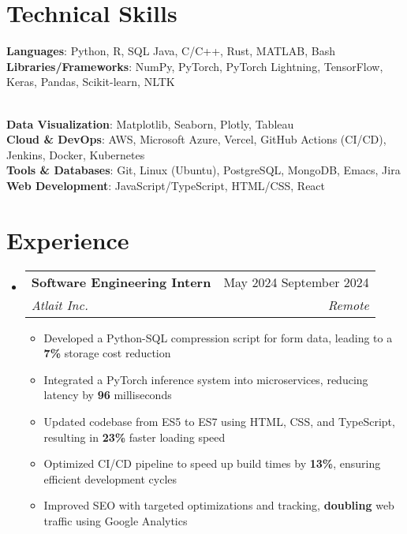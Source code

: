 \documentclass[letterpaper, 11pt]{article}
\makeatletter
\newcommand{\resumeItem}[1]{
    \item \small {
        {#1 \vspace{-3pt}} %
    }
}
\newcommand{\resumeSubheading}[4]{ %
  \vspace{-2pt}\item
    \begin{tabular*}{0.99\textwidth}[t]{l@{\extracolsep{\fill}}r}
      \textbf{#1} & #2 \\
      \textit{\small#3} & \textit{\small #4} \\
    \end{tabular*}\vspace{-7pt}
}
\newcommand{\resumeSubHeadingListStart}{\begin{itemize}[leftmargin=0.15in, label={}]}
\newcommand{\resumeSubHeadingListEnd}{\end{itemize}}
\newcommand{\resumeItemListStart}{\begin{itemize}}
\newcommand{\resumeItemListEnd}{\end{itemize}\vspace{-10pt}}
\makeatother
\begin{document}
\section{Technical Skills}
 \begin{itemize}[leftmargin=0.25in, label={}]
    \small{\item{
     \textbf{Languages}{: Python, R, SQL Java, C/C++, Rust, MATLAB, Bash} \\
     \textbf{Libraries/Frameworks}{: NumPy, PyTorch, PyTorch Lightning, TensorFlow, Keras, Pandas, Scikit-learn, NLTK}
    }} \\
    \textbf{Data Visualization}{: Matplotlib, Seaborn, Plotly, Tableau} \\
    \textbf{Cloud \& DevOps}{: AWS, Microsoft Azure, Vercel, GitHub Actions (CI/CD), Jenkins, Docker, Kubernetes} \\
     \textbf{Tools \& Databases}{: Git, Linux (Ubuntu), PostgreSQL, MongoDB,  Emacs, Jira} \\
     \textbf{Web Development}{: JavaScript/TypeScript, HTML/CSS, React} 
 \end{itemize}

\vspace{-25pt}

\section{Experience}
    \resumeSubHeadingListStart{}
        \resumeSubheading %
        {Software Engineering Intern}{May 2024 \textendash{} September 2024}
        {Atlait Inc.}{Remote}
        \resumeItemListStart{}
            \resumeItem{Developed a Python-SQL compression script for form data, leading to a \textbf{7\%} storage cost reduction}
            \resumeItem{Integrated a PyTorch inference system into microservices, reducing latency by \textbf{96} milliseconds}
            \resumeItem{Updated codebase from ES5 to ES7 using HTML, CSS, and TypeScript, resulting in \textbf{23\%} faster loading speed}
            \resumeItem{Optimized CI/CD pipeline to speed up build times by \textbf{13\%}, ensuring efficient development cycles}
            \resumeItem{Improved SEO with targeted optimizations and tracking, \textbf{doubling} web traffic using Google Analytics}
        \resumeItemListEnd{}
    \resumeSubHeadingListEnd{}

\vspace{-17pt}

\end{document}
